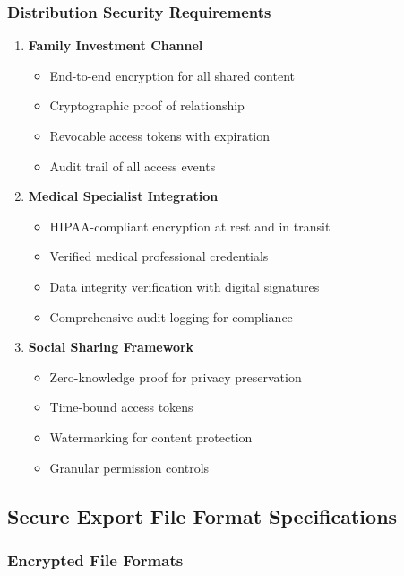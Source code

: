 \documentclass[12pt,a4paper]{article}
\begin{document}
\subsubsection{Distribution Security Requirements}
\begin{enumerate}
    \item \textbf{Family Investment Channel}
    \begin{itemize}
        \item End-to-end encryption for all shared content
        \item Cryptographic proof of relationship
        \item Revocable access tokens with expiration
        \item Audit trail of all access events
    \end{itemize}
    
    \item \textbf{Medical Specialist Integration}
    \begin{itemize}
        \item HIPAA-compliant encryption at rest and in transit
        \item Verified medical professional credentials
        \item Data integrity verification with digital signatures
        \item Comprehensive audit logging for compliance
    \end{itemize}
    
    \item \textbf{Social Sharing Framework}
    \begin{itemize}
        \item Zero-knowledge proof for privacy preservation
        \item Time-bound access tokens
        \item Watermarking for content protection
        \item Granular permission controls
    \end{itemize}
\end{enumerate}

\subsection{Secure Export File Format Specifications}

\subsubsection{Encrypted File Formats}
\end{document}
